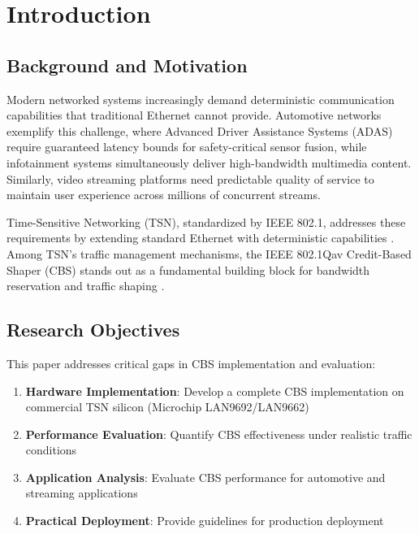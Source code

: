 \documentclass[10pt, journal, compsoc]{IEEEtran}
\begin{document}
\maketitle

\section{Introduction}
\label{sec:introduction}

\subsection{Background and Motivation}

Modern networked systems increasingly demand deterministic communication capabilities that traditional Ethernet cannot provide. Automotive networks exemplify this challenge, where Advanced Driver Assistance Systems (ADAS) require guaranteed latency bounds for safety-critical sensor fusion, while infotainment systems simultaneously deliver high-bandwidth multimedia content. Similarly, video streaming platforms need predictable quality of service to maintain user experience across millions of concurrent streams.

Time-Sensitive Networking (TSN), standardized by IEEE 802.1, addresses these requirements by extending standard Ethernet with deterministic capabilities \cite{finn2018introduction}. Among TSN's traffic management mechanisms, the IEEE 802.1Qav Credit-Based Shaper (CBS) stands out as a fundamental building block for bandwidth reservation and traffic shaping \cite{ieee8021qav}.

\subsection{Research Objectives}

This paper addresses critical gaps in CBS implementation and evaluation:

\begin{enumerate}
    \item \textbf{Hardware Implementation}: Develop a complete CBS implementation on commercial TSN silicon (Microchip LAN9692/LAN9662)
    \item \textbf{Performance Evaluation}: Quantify CBS effectiveness under realistic traffic conditions
    \item \textbf{Application Analysis}: Evaluate CBS performance for automotive and streaming applications
    \item \textbf{Practical Deployment}: Provide guidelines for production deployment
\end{enumerate}
\end{document}
